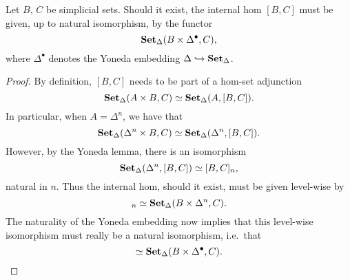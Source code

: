 \documentclass[main.tex]{subfiles}
\begin{document}
\begin{lemma}
  \label{lemma:form_of_internal_hom}
  Let $B$, $C$ be simplicial sets. Should it exist, the internal hom $[B, C]$ must be given, up to natural isomorphism, by the functor
  \begin{equation*}
    \operatorname{\mathbf{Set}_{\Delta}}(B \times \Delta^{\bullet}, C),
  \end{equation*}
  where $\Delta^{\bullet}$ denotes the Yoneda embedding $\Delta \hookrightarrow \operatorname{\mathbf{Set}_{\Delta}}$.
\end{lemma}
\begin{proof}
  By definition, $[B, C]$ needs to be part of a hom-set adjunction
  \begin{equation*}
    \operatorname{\mathbf{Set}_{\Delta}}(A \times B, C) \simeq \operatorname{\mathbf{Set}_{\Delta}}(A, [B, C]).
  \end{equation*}
  In particular, when $A = \Delta^{n}$, we have that
  \begin{equation*}
    \operatorname{\mathbf{Set}_{\Delta}}(\Delta^{n} \times B, C) \simeq \operatorname{\mathbf{Set}_{\Delta}}(\Delta^{n}, [B, C]).
  \end{equation*}
  However, by the Yoneda lemma, there is an isomorphism
  \begin{equation*}
    \operatorname{\mathbf{Set}_{\Delta}}(\Delta^{n}, [B, C]) \simeq [B, C]_{n},
  \end{equation*}
  natural in $n$. Thus the internal hom, should it exist, must be given level-wise by
  \begin{equation*}
    [B, C]_{n} \simeq \SSet(B \times \Delta^{n}, C).
  \end{equation*}
  The naturality of the Yoneda embedding now implies that this level-wise isomorphism must really be a natural isomorphism, i.e.\ that
  \begin{equation*}
    [B, C] \simeq \SSet(B \times \Delta^{\bullet}, C).
  \end{equation*}
\end{proof}
\end{document}
